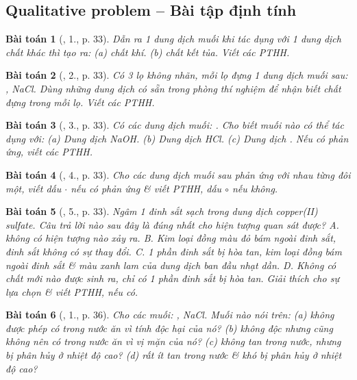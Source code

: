 \documentclass{article}
\newtheorem{baitoan}{Bài toán}
\begin{document}
\subsection{Qualitative problem -- Bài tập định tính}

\begin{baitoan}[\cite{SGK_Hoa_Hoc_9}, 1., p. 33]
	Dẫn ra 1 dung dịch muối khi tác dụng với 1 dung dịch chất khác thì tạo ra: (a) chất khí. (b) chất kết tủa. Viết các PTHH.
\end{baitoan}

\begin{baitoan}[\cite{SGK_Hoa_Hoc_9}, 2., p. 33]
	Có 3 lọ không nhãn, mỗi lọ đựng 1 dung dịch muối sau: \emph{, NaCl}. Dùng những dung dịch có sẵn trong phòng thí nghiệm để nhận biết chất đựng trong mỗi lọ. Viết các PTHH.
\end{baitoan}

\begin{baitoan}[\cite{SGK_Hoa_Hoc_9}, 3., p. 33]
	Có các dung dịch muối: \emph{}. Cho biết muối nào có thể tác dụng với: (a) Dung dịch \emph{NaOH}. (b) Dung dịch \emph{HCl}. (c) Dung dịch \emph{}. Nếu có phản ứng, viết các PTHH.
\end{baitoan}

\begin{baitoan}[\cite{SGK_Hoa_Hoc_9}, 4., p. 33]
	Cho các dung dịch muối sau phản ứng với nhau từng đôi một, viết dấu $\cdot$ nếu có phản ứng \& viết PTHH, dấu $\circ$ nếu không.
\end{baitoan}

\begin{baitoan}[\cite{SGK_Hoa_Hoc_9}, 5., p. 33]
	Ngâm 1 đinh sắt sạch trong dung dịch copper(II) sulfate. Câu trả lời nào sau đây là đúng nhất cho hiện tượng quan sát được? {\sf A.} không có hiện tượng nào xảy ra. {\sf B.} Kim loại đồng màu đỏ bám ngoài đinh sắt, đinh sắt không có sự thay đổi. {\sf C.} 1 phần đinh sắt bị hòa tan, kim loại đồng bám ngoài đinh sắt \& màu xanh lam của dung dịch ban đầu nhạt dần. {\sf D.} Không có chất mới nào được sinh ra, chỉ có 1 phần đinh sắt bị hòa tan. Giải thích cho sự lựa chọn \& viết PTHH, nếu có.
\end{baitoan}

\begin{baitoan}[\cite{SGK_Hoa_Hoc_9}, 1., p. 36]
	Cho các muối: \emph{, NaCl}. Muối nào nói trên: (a) không được phép có trong nước ăn vì tính độc hại của nó? (b) không độc nhưng cũng không nên có trong nước ăn vì vị mặn của nó? (c) không tan trong nước, nhưng bị phân hủy ở nhiệt độ cao? (d) rất ít tan trong nước \& khó bị phân hủy ở nhiệt độ cao?
\end{baitoan}
\end{document}
